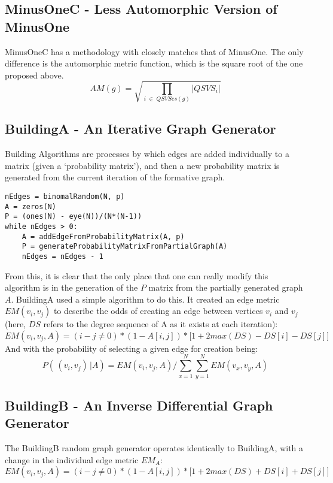 \subsection{MinusOneC - Less Automorphic Version of MinusOne}

MinusOneC has a methodology with closely matches that of MinusOne.
The only difference is the automorphic metric function, which is the square root of the one proposed above.
$$AM(g) = \sqrt{\prod_{i \;\in \;QSVSes(g)} |QSVS_i|}$$

\subsection{BuildingA - An Iterative Graph Generator}

Building Algorithms are processes by which edges are added individually to a matrix (given a `probability matrix'), and then a new probability matrix is generated from the current iteration of the formative graph.

\begin{lstlisting}[frame=single]
nEdges = binomalRandom(N, p)
A = zeros(N)
P = (ones(N) - eye(N))/(N*(N-1))
while nEdges > 0:
	A = addEdgeFromProbabilityMatrix(A, p)
	P = generateProbabilityMatrixFromPartialGraph(A)
	nEdges = nEdges - 1
\end{lstlisting}

From this, it is clear that the only place that one can really modify this algorithm is in the generation of the $P$ matrix from the partially generated graph $A$.
BuildingA used a simple algorithm to do this.
It created an edge metric $EM(v_i, v_j)$ to describe the odds of creating an edge between vertices $v_i$ and $v_j$ (here, $DS$ refers to the degree sequence of A as it exists at each iteration):
$$ EM(v_i, v_j, A) = (i - j  \neq 0) * (1 - A[i, j]) * \Big[ 1 + 2 max(DS) - DS[i] - DS[j] \Big] $$
And with the probability of selecting a given edge for creation being:
$$P(\,(v_i, v_j) \,| A) = EM(v_i, v_j, A) / \sum_{x = 1}^{N} \sum_{y = 1}^{N} EM(v_x, v_y, A)$$

\subsection{BuildingB - An Inverse Differential Graph Generator}

The BuildingB random graph generator operates identically to BuildingA, with a change in the individual edge metric $EM_A$:
$$ EM(v_i, v_j, A) = (i - j  \neq 0) * (1 - A[i, j]) * \Big[ 1 + 2 max(DS) + DS[i] + DS[j] \Big] $$

